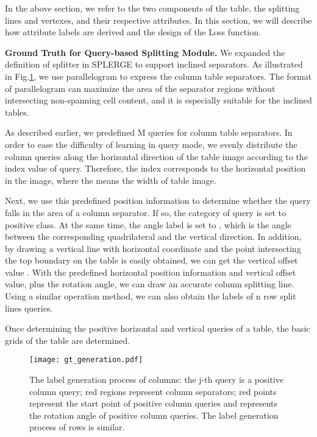 \documentclass[lettersize,journal]{IEEEtran}
\begin{document}
In the above section, we refer to the two components of the table, the splitting lines and vertexes, and their respective attributes. In this section, we will describe how attribute labels are derived and the design of the Loss function.

\textbf{Ground Truth for Query-based Splitting Module.} We expanded the definition of splitter in SPLERGE\cite{tensmeyer2019deep} to support inclined separators. As illustrated in Fig.\ref{fig:gt_generation}, we use parallelogram to express the column table separators. The format of parallelogram can maximize the area of the separator regions without intersecting non-spanning cell content,  and it is especially suitable for the inclined tables.

As described earlier, we predefined M queries for column table separators. In order to ease the difficulty of learning in query mode, we evenly distribute the column queries along the horizontal direction of the table image according to the index value of query. Therefore, the  index corresponds to the  horizontal position in the image, where the  means the width of table image.

Next, we use this predefined position information to determine whether the query falls in the area of a column separator. If so, the category of query is set to positive class. At the same time, the angle label is set to , which is the angle between the corresponding quadrilateral and the vertical direction. In addition, by drawing a vertical line with horizontal coordinate  and the point intersecting the top boundary on the table is easily obtained, we can get the vertical offset value . With the predefined horizontal position information and vertical offset value, plus the rotation angle, we can draw an accurate column splitting line. Using a similar operation method, we can also obtain the labels of n row split lines queries.

Once determining the positive horizontal and vertical queries of a table, the basic grids of the table are determined. 

\begin{figure}
\begin{center}
\texttt{[image: gt\_generation.pdf]}
\end{center}
\caption{The label generation process of columns: the j-th query is a positive column query; red regions represent column separators; red points represent the start point of positive column queries and  represents the rotation angle of positive column queries. The label generation process of rows is similar.}
\label{fig:gt_generation}
\end{figure}
\end{document}

